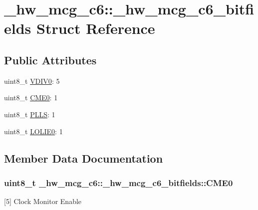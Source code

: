 \hypertarget{struct__hw__mcg__c6_1_1__hw__mcg__c6__bitfields}{}\section{\+\_\+hw\+\_\+mcg\+\_\+c6\+:\+:\+\_\+hw\+\_\+mcg\+\_\+c6\+\_\+bitfields Struct Reference}
\label{struct__hw__mcg__c6_1_1__hw__mcg__c6__bitfields}
\subsection*{Public Attributes}
\begin{DoxyCompactItemize}
\item 
uint8\+\_\+t \hyperlink{struct__hw__mcg__c6_1_1__hw__mcg__c6__bitfields_aedd6b51501c645debc38d60552324ca4}{V\+D\+I\+V0}\+: 5
\item 
uint8\+\_\+t \hyperlink{struct__hw__mcg__c6_1_1__hw__mcg__c6__bitfields_aef2b4ac8c07650cdd19b2294cb7c09db}{C\+M\+E0}\+: 1
\item 
uint8\+\_\+t \hyperlink{struct__hw__mcg__c6_1_1__hw__mcg__c6__bitfields_ad09e4a1a1823c7d92acd5f85753515d4}{P\+L\+LS}\+: 1
\item 
uint8\+\_\+t \hyperlink{struct__hw__mcg__c6_1_1__hw__mcg__c6__bitfields_a11614fbaa5a28a0e7aee889a3e319f18}{L\+O\+L\+I\+E0}\+: 1
\end{DoxyCompactItemize}


\subsection{Member Data Documentation}
\subsubsection[{\texorpdfstring{C\+M\+E0}{CME0}}]{\setlength{\rightskip}{0pt plus 5cm}uint8\+\_\+t \+\_\+hw\+\_\+mcg\+\_\+c6\+::\+\_\+hw\+\_\+mcg\+\_\+c6\+\_\+bitfields\+::\+C\+M\+E0}\hypertarget{struct__hw__mcg__c6_1_1__hw__mcg__c6__bitfields_aef2b4ac8c07650cdd19b2294cb7c09db}{}\label{struct__hw__mcg__c6_1_1__hw__mcg__c6__bitfields_aef2b4ac8c07650cdd19b2294cb7c09db}
\mbox{[}5\mbox{]} Clock Monitor Enable 
